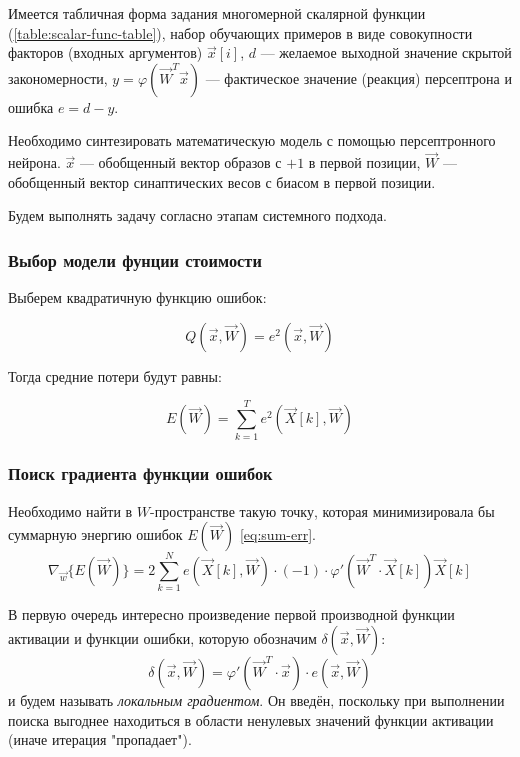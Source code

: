 \documentclass[a4paper]{article}
\numberwithin{equation}{subsection}
\begin{document}
Имеется табличная форма задания многомерной скалярной функции (\ref{table:scalar-func-table}), 
набор обучающих примеров в виде совокупности факторов (входных аргументов) $\vec{x}[i]$, $d$ ---
желаемое выходной значение скрытой закономерности, $y = \varphi (\vec{W}^T \vec{x})$ ---
фактическое значение (реакция) персептрона и ошибка $e = d - y$.

Необходимо синтезировать математическую модель с помощью персептронного нейрона. 
$\vec{x}$ --- обобщенный вектор образов с $+1$ в первой позиции, $\vec{W}$ ---
обобщенный вектор синаптических весов с биасом в первой позиции.

Будем выполнять задачу согласно этапам системного подхода.



\subsubsection{Выбор модели фунции стоимости}

Выберем квадратичную функцию ошибок:

\begin{equation}
    Q(\vec{x}, \vec{W}) = e^2(\vec{x}, \vec{W})
\end{equation}

Тогда средние потери будут равны:
    
\begin{equation}
    E(\vec{W}) = \sum_{k=1}^{T} e^2 (\vec{X}[k], \vec{W})
    \label{eq:sum-err}
\end{equation}



\subsubsection{Поиск градиента функции ошибок}

Необходимо найти в $W$-пространстве такую точку, которая минимизировала бы суммарную 
энергию ошибок $E(\vec{W})$ \ref{eq:sum-err}.
\begin{equation}
    \nabla_{\vec{w}} \{ E(\vec{W}) \} = 2 \sum_{k=1}^{N} e (\vec{X}[k], \vec{W}) \cdot (-1)
    \cdot \varphi ' (\vec{W}^T \cdot \vec{X}[k]) \vec{X}[k]
\end{equation}

В первую очередь интересно произведение первой производной функции активации и функции ошибки, 
которую обозначим $\delta(\vec{x}, \vec{W})$:
\begin{equation}
    \delta(\vec{x}, \vec{W}) = \varphi ' (\vec{W}^{T} \cdot \vec{x}) \cdot e(\vec{x}, \vec{W})
    \label{eq:local_grad}
\end{equation}
\noindent
и будем называть \textit{локальным градиентом}. 
Он введён, поскольку при выполнении поиска выгоднее находиться в области ненулевых значений
функции активации (иначе итерация "пропадает").
\end{document}
